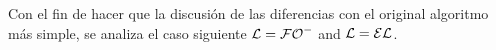 %
%
%
%
%
%
%
%
%

Con el fin de hacer que la discusi\'on de las diferencias con el original
algoritmo m\'as simple, se analiza el caso siguiente $\mathcal{L}={\mathcal{FO}^-}$ and $\mathcal{L}=\mathcal{EL}$.

%
%
